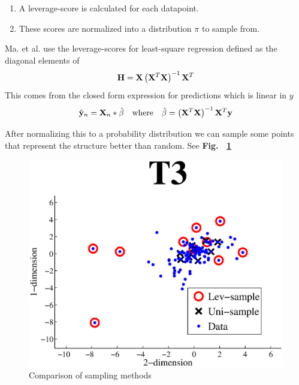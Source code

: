\documentclass{article}
\begin{document}
\begin{enumerate}
\item A leverage-score is calculated for each datapoint.
\item These scores are normalized into a distribution $\pi$ to sample from.
\end{enumerate}

Ma. et al. \cite{Ma} use the leverage-scores for least-square regression defined as the diagonal elements of
\begin{equation}
{\bf H} = {\bf X} \left( {\bf X}^T {\bf X} \right)^{-1} {\bf X}^T
 \label{eq:hdist}
\end{equation}
This comes from the closed form expression for predictions which is linear in $y$
\begin{equation*}
	\hat{{\bf y}}_n = {\bf X}_n*\hat{\beta} \quad \text{where} \quad \hat{\beta} = \left( {\bf X}^T {\bf X} \right)^{-1} {\bf X}^T {\bf y} 
\end{equation*}

After normalizing this to a probability distribution we can sample some points that represent the structure better than random. See {\bf Fig.~ \ref{fig:selection}}

\begin{figure}[b]
	\centering
    \includegraphics[width=.5\linewidth]{images/selection.eps}
    \caption{Comparison of sampling methods}
    \label{fig:selection}
\end{figure}
\end{document}
